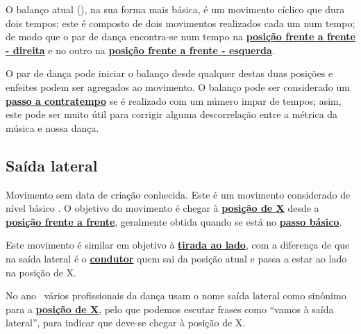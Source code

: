 O balanço atual (\AnoLivro), na sua forma mais básica, é um movimento cíclico que dura dois tempos;
este é composto de dois movimentos realizados cada um num tempo; de modo que
o par de dança encontra-se num tempo na
\hyperref[def:ffd-position]{\textbf{posição frente a frente - direita}}
e no outro na
\hyperref[def:ffe-position]{\textbf{posição frente a frente - esquerda}}.


O par de dança pode iniciar o balanço desde qualquer destas duas posições
e enfeites podem ser agregados ao movimento.
O balanço pode ser considerado um 
\hyperref[def:PassoAContratempo]{\textbf{passo a contratempo}} 
se é realizado com um número impar de tempos; asim, este pode ser muito útil para 
corrigir alguma descorrelação entre a métrica da música e nossa dança.


\subsection{Saída lateral}
\label{subsec:saidalateral}

Movimento sem data de criação conhecida.
Este é um movimento considerado de nível básico \cite[pp. 144]{perna2002samba}.
O objetivo do movimento é chegar à \hyperref[def:X-position]{\textbf{posição de X}} 
desde a \hyperref[def:frente-frente-position]{\textbf{posição frente a frente}}, 
geralmente obtida quando se está no \hyperref[subsec:passobasico]{\textbf{passo básico}}.

Este movimento é similar em objetivo à \hyperref[subsec:tiradaaolado]{\textbf{tirada ao lado}},
com a diferença de que na saída lateral é o \hyperref[def:Condutor]{\textbf{condutor}} 
quem sai da posição atual e passa a estar ao lado na posição de X. 

\caracterpostura{\NoCheckedItem}{\CheckedItem}
No ano \AnoLivro~vários profissionais da dança usam o nome saída lateral como sinônimo para a  
\hyperref[def:X-position]{\textbf{posição de X}}, pelo que podemos escutar frases como
``vamos à saída lateral'', para indicar que deve-se chegar à posição de X.

